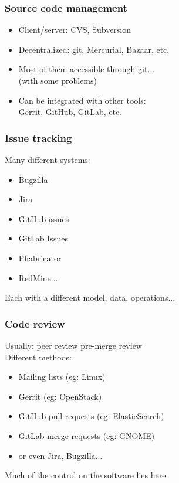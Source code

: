\documentclass[17pt,aspectratio=169,hyperref=pdfusetitle]{beamer}
\begin{document}

\begin{frame}
\frametitle{Source code management}

\begin{itemize}
\item Client/server: CVS, Subversion
\item Decentralized: git, Mercurial, Bazaar, etc.
\item Most of them accessible through git... \\
  (with some problems)
\item Can be integrated with other tools: \\
  Gerrit, GitHub, GitLab, etc.
\end{itemize}
\end{frame}


\begin{frame}
\frametitle{Issue tracking}

Many different systems:

\begin{itemize}
\item Bugzilla
\item Jira
\item GitHub issues
\item GitLab Issues
\item Phabricator
\item RedMine...
\end{itemize}

Each with a different model, data, operations...

\end{frame}



\begin{frame}
\frametitle{Code review}

Usually: peer review pre-merge review \\

Different methods: 

  \begin{itemize}
  \item Mailing lists (eg: Linux)
  \item Gerrit (eg: OpenStack)
  \item GitHub pull requests (eg: ElasticSearch)
  \item GitLab merge requests (eg: GNOME)
  \item or even Jira, Bugzilla...
  \end{itemize}

  \begin{flushright}
    Much of the control on the software lies here \\
  \end{flushright}
\end{frame}
\end{document}

